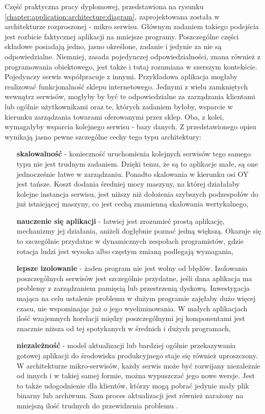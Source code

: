 Część praktyczna pracy dyplomowej, przedstawiona na rysunku
\ref{chapter:application:architecture:diagram}, zaprojektowana została w architekturze
rozproszonej - mikro serwisu. Głównym zadaniem takiego podejścia
jest rozbicie faktycznej aplikacji na mniejsze programy. Poszczególne części składowe posiadają jedno, 
jasno określone, zadanie i jedynie za nie są odpowiedzialne. Niemniej, zasada pojedynczej odpowiedzialności, znana również z programowania obiektowego, jest także i tutaj rozumiana w szerszym
kontekście. Pojedynczy serwis współpracuje z innymi. Przykładowa aplikacja mogłaby realizować funkcjonalność 
sklepu internetowego. Jednymi z wielu zamkniętych wewnątrz serwisów, mogłyby by być te odpowiedzialne za zarządzania
klientami lub ogólnie użytkownikami oraz te, których zadaniem byłoby, wsparcie w kierunku zarządzania towarami oferowanymi
przez sklep. Oba, z kolei, wymagałyby wsparcia kolejnego serwisu - bazy danych. Z przedstawionego opisu wynikają jasno pewne
szczególne cechy tego typu architektury:
\begin{itemize}
    \item[\textbf{skalowalność}] - konieczność uruchomienia kolejnych serwisów tego samego typu nie jest trudnym zadaniem. Dzięki temu, 
    że są to aplikacje małe, są one jednocześnie łatwe w zarządzaniu. Ponadto skalowania w kierunku osi OY jest tańsze. Koszt
    dodania średniej mocy maszyny, na której działałaby kolejne instancja serwisu, jest niższy niż dołożenia szybszych podzespołów
    do już istniejącej maszyny, co jest cechą znamienną skalowania wertykalnego,
    \item[\textbf{nauczenie się aplikacji}] - łatwiej jest zrozumieć prostą aplikację, mechanizmy jej działania, aniżeli dogłębnie poznać
    jedną większą. Okazuje się to szczególnie przydatne w dynamicznych zespołach programistów, gdzie rotacja ludzi jest wysoka albo
    częstym zmianą podlegają wymagania,
    \item[\textbf{lepsze izolowanie}] - żaden program nie jest wolny od błędów. Izolowania poszczególnych serwisów jest szczególnie
    przydatne, jeśli dana aplikacja ma problemy z zarządzaniem pamięcią lub przestrzenią dyskową. Inwestygacja mająca 
    na celu ustalenie problemu w dużym programie zajęłaby dużo więcej czasu, nie wspominając już o jego wyeliminowania. 
    W małych aplikacjach ilość wzajemnych korelacji między poszczególnymi jej komponentami jest znacznie niższa od tej
    spotykanych w średnich i dużych programach,
    \item[\textbf{niezależność}] - model aktualizacji lub bardziej ogólnie przekazywania gotowej aplikacji do środowiska produkcyjnego
    staje się również uproszczony. W architekturze mikro-serwisów, każdy serwis może być rozwijany niezależnie od innych i 
    w takiej samej formie, można wypuszczać jego nowe wersje. Jest to także udogodnienie dla klientów, którzy mogą
    pobrać jedynie mały plik binarny lub archiwum. Sam proces aktualizacji jest również narażony na mniejszą ilość
    trudnych do przewidzenia problemu \cite{microservice_architecture}. 
\end{itemize}

